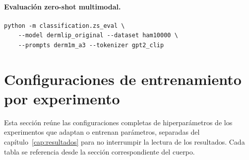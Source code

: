 \paragraph{Evaluación zero-shot multimodal.}
{\footnotesize\begin{verbatim}
python -m classification.zs_eval \
    --model dermlip_original --dataset ham10000 \
    --prompts derm1m_a3 --tokenizer gpt2_clip
\end{verbatim}}

\section{Configuraciones de entrenamiento por experimento}
\label{sec:anexoa-configs}

Esta sección reúne las configuraciones completas de hiperparámetros
de los experimentos que adaptan o entrenan parámetros, separadas del
capítulo~\ref{cap:resultados} para no interrumpir la lectura de los
resultados. Cada tabla se referencia desde la sección
correspondiente del cuerpo.

